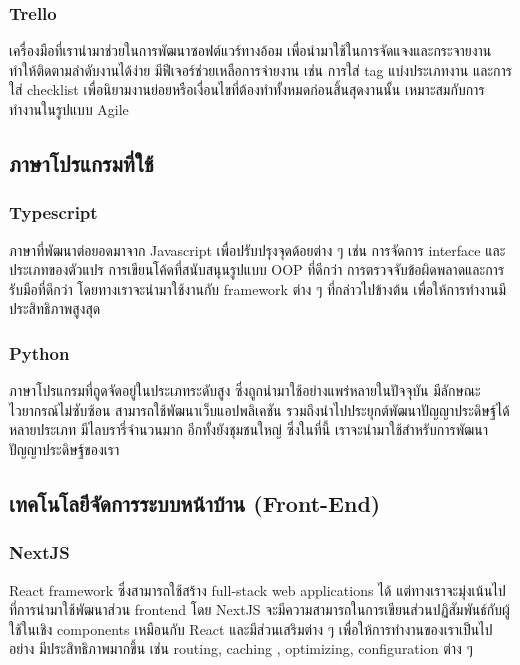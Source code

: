 \subsubsection{Trello}
เครื่องมือที่เรานำมาช่วยในการพัฒนาซอฟต์แวร์ทางอ้อม เพื่อนำมาใช้ในการจัดแจงและกระจายงาน ทำให้ติดตามลำดับงานได้ง่าย
มีฟีเจอร์ช่วยเหลือการจ่ายงาน เช่น การใส่ tag แบ่งประเภทงาน และการใส่ checklist เพื่อนิยามงานย่อยหรือเงื่อนไขที่ต้องทำทั้งหมดก่อนสิ้นสุดงานนั้น
เหมาะสมกับการทำงานในรูปแบบ Agile
\subsection{ภาษาโปรแกรมที่ใช้}
\subsubsection{Typescript}
ภาษาที่พัฒนาต่อยอดมาจาก Javascript เพื่อปรับปรุงจุดด้อยต่าง ๆ เช่น การจัดการ
interface และประเภทของตัวแปร การเขียนโค้ดที่สนับสนุนรูปแบบ OOP ที่ดีกว่า
การตรวจจับข้อผิดพลาดและการรับมือที่ดีกว่า โดยทางเราจะนำมาใช้งานกับ framework
ต่าง ๆ ที่กล่าวไปข้างต้น เพื่อให้การทำงานมีประสิทธิภาพสูงสุด
\subsubsection{Python}
ภาษาโปรแกรมที่ถูดจัดอยู่ในประเภทระดับสูง ซึ่งถูกนำมาใช้อย่างแพร่หลายในปัจจุบัน
มีลักษณะไวยากรณ์ไม่ซับซ้อน สามารถใช้พัฒนาเว็บแอปพลิเคชัน
รวมถึงนำไปประยุกต์พัฒนาปัญญาประดิษฐ์ได้หลายประเภท
มีไลบรารี่จำนวนมาก อีกทั้งยังชุมชนใหญ่ ซึ่งในที่นี้ เราจะนำมาใช้สำหรับการพัฒนาปัญญาประดิษฐ์ของเรา
\subsection{เทคโนโลยีจัดการระบบหน้าบ้าน (Front-End)}
\subsubsection{NextJS}
React framework ซึ่งสามารถใช้สร้าง full-stack web applications ได้
แต่ทางเราจะมุ่งเน้นไปที่การนำมาใช้พัฒนาส่วน frontend โดย NextJS
จะมีความสามารถในการเขียนส่วนปฏิสัมพันธ์กับผู้ใช้ในเชิง components
เหมือนกับ React และมีส่วนเสริมต่าง ๆ เพื่อให้การทำงานของเราเป็นไปอย่าง
มีประสิทธิภาพมากขึ้น เช่น routing, caching , optimizing, configuration
ต่าง ๆ

